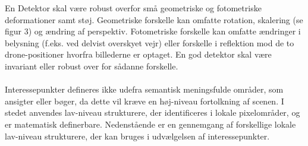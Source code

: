En Detektor skal være robust overfor små geometriske og fotometriske deformationer samt støj. Geometriske forskelle kan omfatte rotation, skalering (se figur 3) og ændring af perspektiv.  Fotometriske forskelle kan omfatte ændringer i belysning (f.eks. ved delvist overskyet vejr) eller forskelle i reflektion mod de to drone-positioner hvorfra billederne er optaget. En god detektor skal være invariant eller robust over for sådanne forskelle.
\\
\\
Interessepunkter defineres ikke udefra semantisk meningsfulde områder, som ansigter eller bøger, da dette vil kræve en høj-niveau fortolkning af scenen. I stedet anvendes lav-niveau strukturere, der identificeres i lokale pixelområder, og er matematisk definerbare. Nedenstående er en gennemgang af forskellige lokale lav-niveau strukturere, der kan bruges i udvælgelsen af interessepunkter.
\newpage



